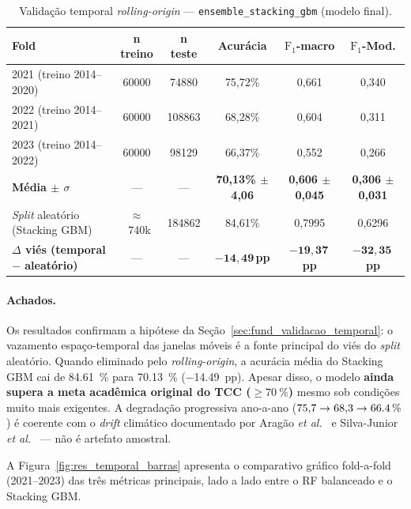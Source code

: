 \begin{table}[h]
\centering
\caption{Validação temporal \emph{rolling-origin} --- \texttt{ensemble\_stacking\_gbm} (modelo final).}
\label{tab:res_temporal_stacking}
\small
\begin{tabular}{lccccc}
\toprule
\textbf{Fold} & \textbf{n treino} & \textbf{n teste} & \textbf{Acurácia} & \textbf{$\text{F}_1$-macro} & \textbf{$\text{F}_1$-Mod.} \\
\midrule
2021 (treino 2014--2020) & \num{60000}  & \num{74880}  & 75,72\% & 0,661 & 0,340 \\
2022 (treino 2014--2021) & \num{60000}  & \num{108863} & 68,28\% & 0,604 & 0,311 \\
2023 (treino 2014--2022) & \num{60000}  & \num{98129}  & 66,37\% & 0,552 & 0,266 \\
\textbf{Média $\pm$ $\sigma$} & --- & --- & \textbf{70,13\% $\pm$ 4,06} & \textbf{0,606 $\pm$ 0,045} & \textbf{0,306 $\pm$ 0,031} \\
\midrule
\emph{Split} aleatório (Stacking GBM) & $\approx$~740k & \num{184862} & 84,61\% & 0,7995 & 0,6296 \\
\textbf{$\Delta$ viés (temporal $-$ aleatório)} & --- & --- & $\boldsymbol{-14{,}49}$\,\textbf{pp} & $\boldsymbol{-19{,}37}$\,\textbf{pp} & $\boldsymbol{-32{,}35}$\,\textbf{pp} \\
\bottomrule
\end{tabular}
\end{table}

\paragraph{Achados.} Os resultados confirmam a hipótese da Seção~\ref{sec:fund_validacao_temporal}: o vazamento espaço-temporal das janelas móveis é a fonte principal do viés do \emph{split} aleatório. Quando eliminado pelo \emph{rolling-origin}, a acurácia média do Stacking GBM cai de \SI{84,61}{\percent} para \SI{70,13}{\percent} ($-$\SI{14,49}{pp}). Apesar disso, o modelo \textbf{ainda supera a meta acadêmica original do TCC ($\geq \SI{70}{\percent}$)} mesmo sob condições muito mais exigentes. A degradação progressiva ano-a-ano (\(75{,}7 \to 68{,}3 \to \SI{66{,}4}{\percent}\)) é coerente com o \emph{drift} climático documentado por Aragão \emph{et al.}~\cite{aragao2018amazon} e Silva-Junior \emph{et al.}~\cite{silvajunior2025amazon} --- não é artefato amostral.

A Figura~\ref{fig:res_temporal_barras} apresenta o comparativo gráfico fold-a-fold (2021--2023) das três métricas principais, lado a lado entre o RF balanceado e o Stacking GBM.

